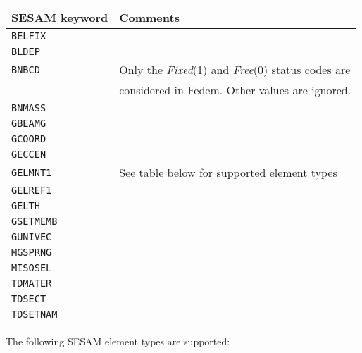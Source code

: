 \medskip
\begin{tabular}{| m{} | m{} |}
  \hline
  \rowcolor[HTML]{EFEFEF} SESAM keyword  &  Comments  \\
  \hline\hline
  {\tt BELFIX}   & \\\hline
  {\tt BLDEP}    & \\\hline
  {\tt BNBCD }   & Only the {\sl Fixed}(1) and {\sl Free}(0) status codes are \\
                 & considered in Fedem. Other values are ignored. \\\hline
  {\tt BNMASS}   & \\\hline
  {\tt GBEAMG}   & \\\hline
  {\tt GCOORD}   & \\\hline
  {\tt GECCEN}   & \\\hline
  {\tt GELMNT1}  & See table below for supported element types \\\hline
  {\tt GELREF1}  & \\\hline
  {\tt GELTH}    & \\\hline
  {\tt GSETMEMB} & \\\hline
  {\tt GUNIVEC}  & \\\hline
  {\tt MGSPRNG}  & \\\hline
  {\tt MISOSEL}  & \\\hline
  {\tt TDMATER}  & \\\hline
  {\tt TDSECT}   & \\\hline
  {\tt TDSETNAM} & \\\hline
\end{tabular}

\clearpage

The following SESAM element types are supported:

